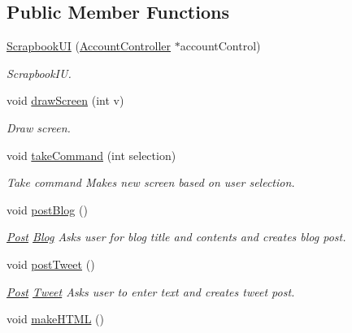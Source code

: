 \subsection*{Public Member Functions}
\begin{DoxyCompactItemize}
\item 
\hyperlink{classScrapbookUI_ac6b7ce656599b4b1be8a89a9268ac8a4}{Scrapbook\+UI} (\hyperlink{classAccountController}{Account\+Controller} $\ast$account\+Control)
\begin{DoxyCompactList}\small\item\em Scrapbook\+IU. \end{DoxyCompactList}\item 
void \hyperlink{classScrapbookUI_ae827fcb9cd147e05bbe8074a286ef10f}{draw\+Screen} (int v)
\begin{DoxyCompactList}\small\item\em Draw screen. \end{DoxyCompactList}\item 
void \hyperlink{classScrapbookUI_a456e4a0842c15ab4437f7a5762893f72}{take\+Command} (int selection)
\begin{DoxyCompactList}\small\item\em Take command Makes new screen based on user selection. \end{DoxyCompactList}\item 
void \hyperlink{classScrapbookUI_ace503d6cacce475f83cb5faa84c2d4ee}{post\+Blog} ()\hypertarget{classScrapbookUI_ace503d6cacce475f83cb5faa84c2d4ee}{}\label{classScrapbookUI_ace503d6cacce475f83cb5faa84c2d4ee}

\begin{DoxyCompactList}\small\item\em \hyperlink{classPost}{Post} \hyperlink{classBlog}{Blog} Asks user for blog title and contents and creates blog post. \end{DoxyCompactList}\item 
void \hyperlink{classScrapbookUI_af648b16a538505eb0ba4d8dd1d43ad88}{post\+Tweet} ()\hypertarget{classScrapbookUI_af648b16a538505eb0ba4d8dd1d43ad88}{}\label{classScrapbookUI_af648b16a538505eb0ba4d8dd1d43ad88}

\begin{DoxyCompactList}\small\item\em \hyperlink{classPost}{Post} \hyperlink{classTweet}{Tweet} Asks user to enter text and creates tweet post. \end{DoxyCompactList}\item 
void \hyperlink{classScrapbookUI_a9f971abd5269dd2daee0262965115863}{make\+H\+T\+ML} ()\hypertarget{classScrapbookUI_a9f971abd5269dd2daee0262965115863}{}\label{classScrapbookUI_a9f971abd5269dd2daee0262965115863}


\end{DoxyCompactItemize}
